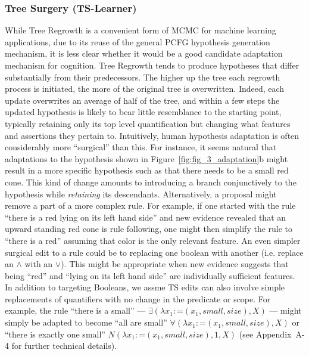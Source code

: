 \documentclass[doc,natbib,floatsintext]{apa7}
\begin{document}
\subsubsection{Tree Surgery (TS-Learner)}
While Tree Regrowth is a convenient form of MCMC for machine learning applications, due to its reuse of the general PCFG hypothesis generation mechanism, it is less clear whether it would be a good candidate adaptation mechanism for cognition. Tree Regrowth tends to produce hypotheses that differ substantially from their predecessors. The higher up the tree each regrowth process is initiated, the more of the original tree is overwritten. Indeed, each update overwrites an average of half of the tree, and within a few steps the updated hypothesis is likely to bear little resemblance to the starting point, typically retaining only its top level quantification but changing what features and assertions they pertain to. Intuitively, human hypothesis adaptation is often considerably more ``surgical'' than this. For instance, it seems natural that adaptations to the hypothesis shown in Figure~\ref{fig:fig_3_adaptation}b might result in a more specific hypothesis such as that there needs to be a small red cone. This kind of change amounts to introducing a branch conjunctively to the hypothesis while \emph{retaining} its descendants. Alternatively, a proposal might remove a part of a more complex rule. For example, if one started with the rule ``there is a red lying on its left hand side'' and new evidence revealed that an upward standing red cone is rule following, one might then simplify the rule to ``there is a red'' assuming that color is the only relevant feature. An even simpler surgical edit to a rule could be to replacing one boolean with another (i.e. replace an $\land$ with an $\lor$). This might be appropriate when new evidence suggests that being ``red'' and ``lying on its left hand side'' are individually sufficient features. In addition to targeting Booleans, we assme TS edits can also involve simple replacements of quantifiers with no change in the predicate or scope. For example, the rule ``there is a small'' --- \(\exists(\lambda x_{1}\!:\! \text{=}(x_{1},small,size), X)\) --- might simply be adapted to become ``all are small'' $\forall(\lambda x_{1}\!:\! \text{=}(x_{1}, small,size),X)$ or ``there is exactly one small'' $N(\lambda x_{1}\!:\! \text{=}(x_{1}, small,size),1, X)$ (see Appendix~A-4 for further technical details).
\end{document}
